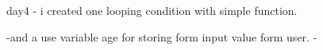 day4
- i created one looping condition with simple function.

-and a use variable age for storing form input value form user.
-
